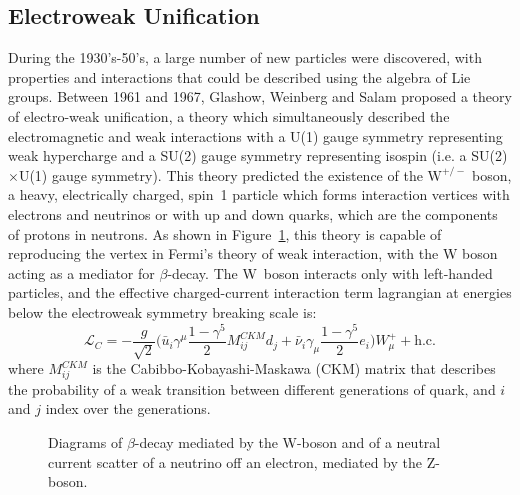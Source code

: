 \documentclass[/main.tex]{subfiles}
\begin{document}
\subsection{Electroweak Unification}
During the 1930's-50's, a large number of new particles were discovered, with properties and interactions that could be described using the algebra of Lie groups.
Between 1961 and 1967, Glashow, Weinberg and Salam proposed a theory of electro-weak unification, a theory which simultaneously described the electromagnetic and weak interactions with a U(1) gauge symmetry representing weak hypercharge and a SU(2) gauge symmetry representing isospin (i.e. a SU(2)$\times$U(1) gauge symmetry)\cite{Glashow1962, Weinberg1967, Salam1968}.
This theory predicted the existence of the $\mathrm{W}^{+/-}$ boson, a heavy, electrically charged, spin~1 particle which forms interaction vertices with electrons and neutrinos or with up and down quarks, which are the components of protons in neutrons.
As shown in Figure~\ref{fig:betadecayW}, this theory is capable of reproducing the vertex in Fermi's theory of weak interaction, with the W boson acting as a mediator for $\beta$-decay.
The W~boson interacts only with left-handed particles, and the effective charged-current interaction term lagrangian at energies below the electroweak symmetry breaking scale is:
\begin{equation}
  \mathcal{L}_C=-\frac{g}{\sqrt{2}}\big(\bar u_i \gamma^\mu \frac{1-\gamma^5}{2} M^{CKM}_{ij}d_j + \bar \nu_i \gamma_\mu \frac{1-\gamma^5}{2} e_i\big)W^+_\mu + \mathrm{h.c.}  
\end{equation}
where $M^{CKM}_{ij}$ is the Cabibbo-Kobayashi-Maskawa (CKM) matrix that describes the probability of a weak transition between different generations of quark, and $i$ and $j$ index over the generations.
\begin{figure}[t]
  \centering
  \caption[$\beta$-decay diagram with W]{\label{fig:betadecayW}
    Diagrams of $\beta$-decay mediated by the W-boson and of a neutral current scatter of a neutrino off an electron, mediated by the Z-boson.
  }
\end{figure}
\end{document}

